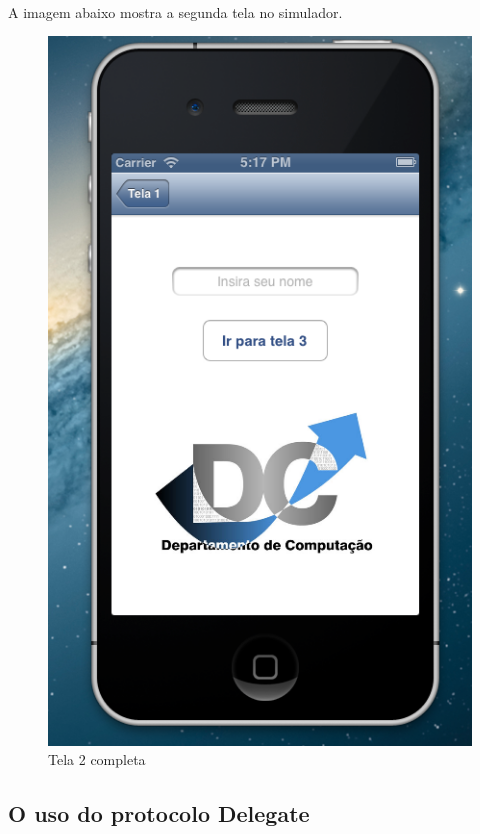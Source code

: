 \documentclass[a4paper,12pt,brazil,doubleside]{book}
\begin{document}
\pagebreak

\paragraph{}A imagem abaixo mostra a segunda tela no simulador.

\begin{figure}[h]
  \centering
  \includegraphics[totalheight=0.5\textheight]{figuras/2/simulador2_tela2.png}
  \caption{Tela 2 completa}
  \label{fig:a}
\end{figure}

\bigskip

\subsection{O uso do protocolo Delegate}
\end{document}

